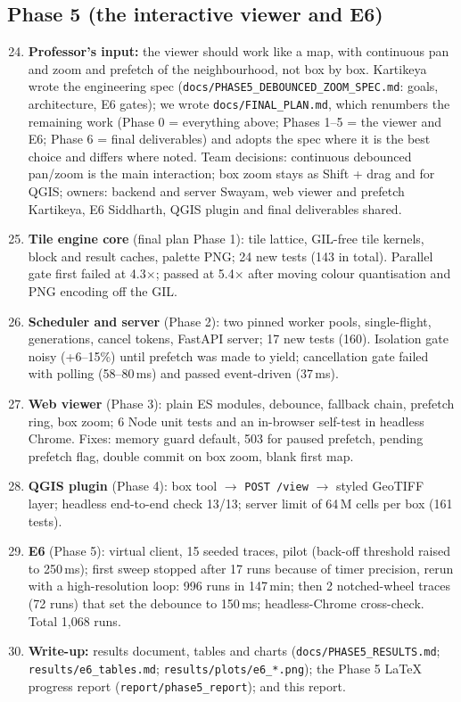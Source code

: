 ﻿\documentclass[11pt,a4paper]{article}
\newcommand{\code}[1]{\texttt{#1}}
\begin{document}
\subsection{Phase 5 (the interactive viewer and E6)}
\begin{enumerate}
\setcounter{enumi}{23}
\item \textbf{Professor's input:} the viewer should work like a map, with continuous pan and zoom and prefetch of the
neighbourhood, not box by box. Kartikeya wrote the engineering spec (\code{docs/PHASE5\_DEBOUNCED\_ZOOM\_SPEC.md}: goals,
architecture, E6 gates); we wrote \code{docs/FINAL\_PLAN.md}, which renumbers the remaining work (Phase 0 = everything
above; Phases 1--5 = the viewer and E6; Phase 6 = final deliverables) and adopts the spec where it is the best
choice and differs where noted. Team decisions: continuous debounced pan/zoom is the main interaction; box zoom stays
as Shift + drag and for QGIS; owners: backend and server Swayam, web viewer and prefetch Kartikeya, E6 Siddharth,
QGIS plugin and final deliverables shared.
\item \textbf{Tile engine core} (final plan Phase 1): tile lattice, GIL-free tile kernels, block and result caches,
palette PNG; 24 new tests (143 in total). Parallel gate first failed at 4.3$\times$; passed at 5.4$\times$ after
moving colour quantisation and PNG encoding off the GIL.
\item \textbf{Scheduler and server} (Phase 2): two pinned worker pools, single-flight, generations, cancel tokens,
FastAPI server; 17 new tests (160). Isolation gate noisy (+6--15\%) until prefetch was made to yield; cancellation
gate failed with polling (58--80\,ms) and passed event-driven (37\,ms).
\item \textbf{Web viewer} (Phase 3): plain ES modules, debounce, fallback chain, prefetch ring, box zoom; 6 Node unit
tests and an in-browser self-test in headless Chrome. Fixes: memory guard default, 503 for paused prefetch, pending
prefetch flag, double commit on box zoom, blank first map.
\item \textbf{QGIS plugin} (Phase 4): box tool $\to$ \code{POST /view} $\to$ styled GeoTIFF layer; headless end-to-end check
13/13; server limit of 64\,M cells per box (161 tests).
\item \textbf{E6} (Phase 5): virtual client, 15 seeded traces, pilot (back-off threshold raised to 250\,ms); first sweep
stopped after 17 runs because of timer precision, rerun with a high-resolution loop: 996 runs in 147\,min; then 2
notched-wheel traces (72 runs) that set the debounce to 150\,ms; headless-Chrome cross-check. Total 1{,}068 runs.
\item {\raggedright\textbf{Write-up:} results document, tables and charts (\code{docs/PHASE5\_RESULTS.md};
\code{results/e6\_tables.md}; \code{results/plots/e6\_*.png}); the Phase 5 LaTeX progress report
(\code{report/phase5\_report}); and this report.\par}
\end{enumerate}
\end{document}
